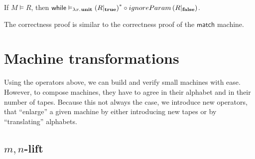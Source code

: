 \documentclass{psartcl}
\newcommand{\lam}[2]{\lambda#1{.}\hskip.7pt#2}
\newcommand{\true}{\mathbf{true}}
\newcommand{\false}{\mathbf{false}}
\newcommand{\unit}{\mathbf{unit}}
\newcommand{\at}[2][]{#1|_{#2}}
\newcommand{\MS}[1]{\textsf{#1}}
\newcommand{\mwhile}[1]{\MS{while}}
\newcommand{\mmatch}{\MS{match}}
\begin{document}
\begin{lemma}
  If $M \vDash R$, then $\mwhile{M} \vDash_{\lam x \unit} \left(R \at \true \right)^* \circ ignoreParam \left(R \at \false \right)$.
\end{lemma}

The correctness proof is similar to the correctness proof of the $\mmatch$ machine.

\section{Machine transformations}
\label{sec:transformations}

Using the operators above, we can build and verify small machines with ease.  However, to compose machines, they have to agree in their alphabet and in
their number of tapes.  Because this not always the case, we introduce new operators, that ``enlarge'' a given machine by either introducing new tapes
or by ``translating'' alphabets.



\subsection{\texorpdfstring{$m,n$}{m,n}-lift}
\end{document}
